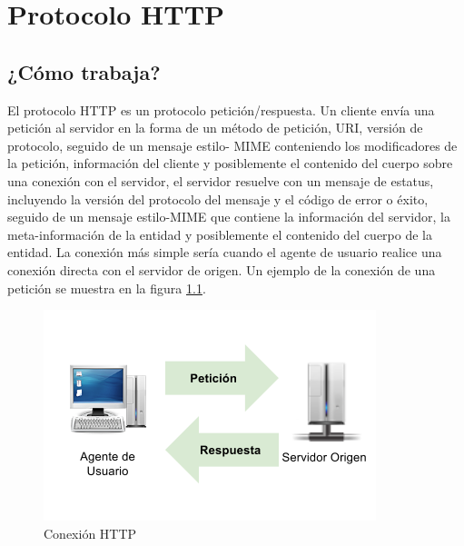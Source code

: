 
\chapter{Protocolo HTTP} %

\label{ch:protocolo_http} %




\section{¿Cómo trabaja?}

El protocolo HTTP es un protocolo petición/respuesta. Un cliente envía una petición al servidor en la forma de un método de petición, URI, versión de protocolo, seguido de un mensaje estilo-
MIME conteniendo los modificadores de la petición, información del cliente y posiblemente el contenido del cuerpo sobre una conexión con el servidor, el servidor resuelve con un mensaje de estatus, incluyendo la versión del protocolo del mensaje y el código de error o éxito, seguido de un mensaje estilo-MIME que contiene la información del servidor, la meta-información de la entidad y posiblemente el contenido del cuerpo de la entidad.
La conexión más simple sería cuando el agente de usuario realice una conexión directa con el servidor de origen. Un ejemplo de la conexión de una petición se muestra en la figura \ref{conexionhttp}.

\begin{figure}[h]
  \centering
    \includegraphics[scale=0.75]{gfx/conexion_http}
  \caption{Conexión HTTP}
  \label{conexionhttp}
\end{figure}


